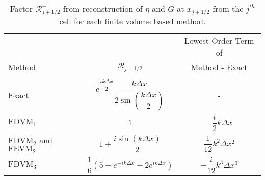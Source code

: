 \begin{table}
	\centering
	\begin{tabular}{l  c  c}
		&&Lowest Order Term of	\\
		Method& $\mathcal{R}^-_{j+1/2}$ &  Method - Exact\B \\
		\hline \\
		Exact & $e^{\dfrac{ik\Delta x}{2}} \dfrac{k\Delta x}{2 \sin\left(\dfrac{k \Delta x}{2}\right)}$ & - \B \\
		$\text{FDVM}_1$& $1$ & $-\dfrac{i}{2}k \Delta x$  \T\B \\
		$\text{FDVM}_2$ and $\text{FEVM}_2$& $1 +  \dfrac{i \sin\left(k\Delta x \right)}{2}$ & $\dfrac{1}{12}k^2 \Delta x^2$  \T\B \\
		$\text{FDVM}_3$& $\dfrac{1}{6}\left({5 - e^{-i k {\Delta x}} +2 e^{i k {\Delta x}}} \right)$ & $-\dfrac{i}{12}k^3 \Delta x^3$  \T\B \\
		\hline
	\end{tabular}
	\caption{Factor $\mathcal{R}^-_{j+1/2}$ from reconstruction of $\eta$ and $G$ at $x_{j+1/2}$ from the ${j^{th}}$ cell for each finite volume based method.}
	\label{tab:Rmfactor}
\end{table}
